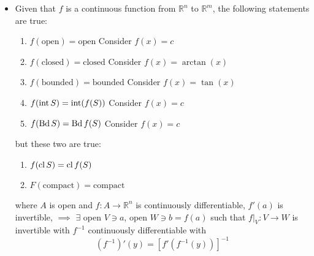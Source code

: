 \begin{itemize}
          \newpage
    \item Given that $f$ is a continuous function from $\mathbb{R}^n$ to $\mathbb{R}^m$, the following statements are true:
          \begin{enumerate}
              \item $f(\text{open})=\text{open}$ {\color{red} Consider $f(x)=c$}
              \item $f(\text{closed})=\text{closed}$ {\color{red} Consider $f(x)=\arctan(x)$}
              \item $f(\text{bounded})=\text{bounded}$  {\color{red} Consider $f(x)=\tan(x)$}
              \item $f(\operatorname{int} S)=\operatorname{int}(f(S))$  {\color{red} Consider $f(x)=c$}
              \item $f(\operatorname{Bd} S)=\operatorname{Bd} f(S)$  {\color{red} Consider $f(x)=c$}
          \end{enumerate}
          but these two are true:
          \begin{enumerate}
              \item $f(\operatorname{cl} S)=\operatorname{cl} f(S)$
              \item $F(\text{compact})=\text{compact}$
          \end{enumerate} where $A$ is open and $f:A\rightarrow \mathbb{R}^n$ is continuously differentiable, $f'(a)$ is invertible, $\implies$ $\exists$ open $V \ni a$, open $W \ni b = f(a)$ such that $f|_V: V\rightarrow W$ is invertible with $f^{-1}$ continuously differentiable with 
          \begin{equation}
              (f^{-1})'(y) = [f'(f^{-1}(y))]^{-1}
          \end{equation}
\end{itemize}